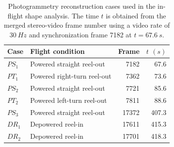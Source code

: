 %
\begin{table}[htp]
    \centering
    \caption{
    Photogrammetry reconstruction cases used in the in-flight shape analysis.
    The time $t$ is obtained from the merged stereo-video frame number using a
    video rate of $30~\unit{Hz}$ and synchronization frame
    7182 at $t=67.6~\unit{s}$.
    }
    \label{9_2:tab:photogrammetry_reconstruction_cases}
    \begin{tabular}{llrr}
        \toprule
        Case & Flight condition & Frame & $t$ $(\unit{s})$ \\
        \midrule
$PS_1$ & Powered straight reel-out & 7182 & 67.6 \\
$PT_1$ & Powered right-turn reel-out & 7362 & 73.6 \\
$PS_2$ & Powered straight reel-out & 7721 & 85.6 \\
$PT_2$ & Powered left-turn reel-out & 7811 & 88.6 \\
$PS_3$ & Powered straight reel-out & 17372 & 407.3 \\
$DR_1$ & Depowered reel-in & 17611 & 415.3 \\
$DR_2$ & Depowered reel-in & 17701 & 418.3 \\
        \bottomrule
    \end{tabular}
\end{table}
%

